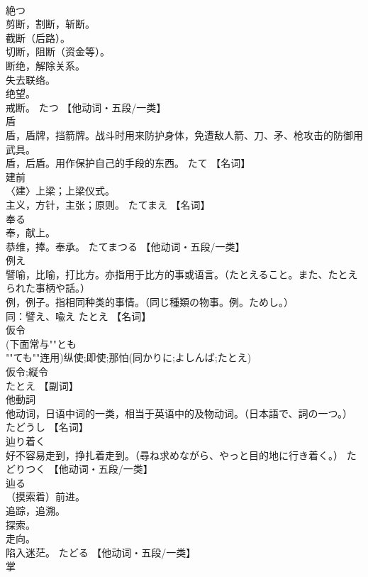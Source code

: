 \documentclass[8pt]{extreport}
\begin{document}
\begin{CJK}{UTF8}{min}
\\	絶つ	
\\	剪断，割断，斩断。 
\\	截断（后路）。 
\\	切断，阻断（资金等）。 
\\	断绝，解除关系。 
\\	失去联络。 
\\	绝望。 
\\	戒断。	たつ		【他动词・五段/一类】
\\	盾	
\\	盾，盾牌，挡箭牌。战斗时用来防护身体，免遭敌人箭、刀、矛、枪攻击的防御用武具。 
\\	盾，后盾。用作保护自己的手段的东西。	たて		【名词】
\\	建前	
\\	〈建〉上梁；上梁仪式。 
\\	主义，方针，主张；原则。	たてまえ		【名词】
\\	奉る	
\\	奉，献上。 
\\	恭维，捧。奉承。	たてまつる		【他动词・五段/一类】
\\	例え	
\\	譬喻，比喻，打比方。亦指用于比方的事或语言。（たとえること。また、たとえられた事柄や話。） 
\\	例，例子。指相同种类的事情。（同じ種類の物事。例。ためし。） 
\\	同：譬え、喩え	たとえ		【名词】
\\	仮令	
\\	(下面常与""とも
\\	""ても""连用)纵使;即使;那怕(同かりに;よしんば;たとえ) 
\\	仮令;縦令 
\\	たとえ		【副词】
\\	他動詞	
\\	他动词，日语中词的一类，相当于英语中的及物动词。（日本語で、詞の一つ。）	たどうし		【名词】
\\	辿り着く	
\\	好不容易走到，挣扎着走到。（尋ね求めながら、やっと目的地に行き着く。）	たどりつく		【他动词・五段/一类】
\\	辿る	
\\	（摸索着）前进。 
\\	追踪，追溯。 
\\	探索。 
\\	走向。 
\\	陷入迷茫。	たどる		【他动词・五段/一类】
\\	掌	

\end{CJK}
\end{document}
